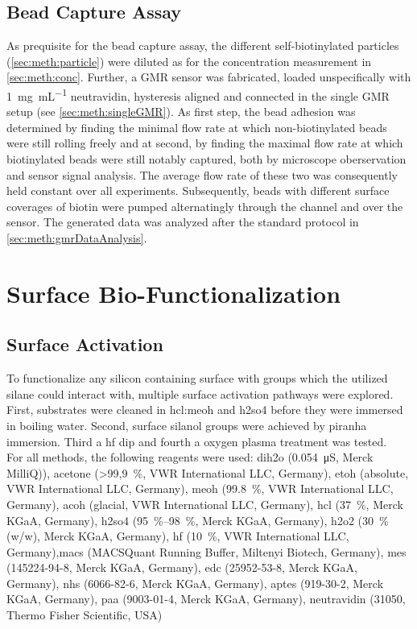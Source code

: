 \subsection{Bead Capture Assay}
As prequisite for the bead capture assay, the different self-biotinylated particles (\cref{sec:meth:particle}) were diluted as for the concentration measurement in \cref{sec:meth:conc}.  Further, a GMR sensor was fabricated, loaded unspecifically with \SI{1}{\milli\gram\per\milli\liter} neutravidin, hysteresis aligned and connected in the single GMR setup (see \ref{sec:meth:singleGMR}). As first step, the bead adhesion was determined by finding the minimal flow rate at which non-biotinylated beads were still rolling freely and at second, by finding the maximal flow rate at which biotinylated beads were still notably captured, both by microscope oberservation and sensor signal analysis. The average flow rate of these two was consequently held constant over all experiments. Subsequently, beads with different surface coverages of biotin were pumped alternatingly through the channel and over the sensor. The generated data was analyzed after the standard protocol in \ref{sec:meth:gmrDataAnalysis}.
\section{Surface Bio-Functionalization}
\subsection{Surface Activation}
\label{sec:meth:surfActiv}
To functionalize any silicon containing surface with  groups which the utilized silane could interact with, multiple surface activation pathways were explored. First, substrates were cleaned in \gls{hcl}:\gls{meoh} and \gls{h2so4} before they were immersed in boiling water. Second, surface silanol groups were achieved by piranha immersion. Third a \gls{hf} dip and fourth a oxygen plasma treatment was tested.\\
For all methods, the following reagents were used: \gls{dih2o} (\SI{0,054}{\micro\siemens}, Merck MilliQ)), acetone (\SI{>99,9}{\percent}, VWR International LLC, Germany), \gls{etoh} (absolute, VWR International LLC, Germany), \gls{meoh} (\SI{99.8}{\percent}, VWR International LLC, Germany), \gls{acoh} (glacial,  VWR International LLC, Germany), \gls{hcl} (\SI{37}{\percent}, Merck KGaA, Germany), \gls{h2so4} (\SIrange{95}{98}{\percent}, Merck KGaA, Germany), \gls{h2o2} (\SI{30}{\percent} (w/w), Merck KGaA, Germany), \gls{hf} (\SI{10}{\percent},  VWR International LLC, Germany),\gls{macs} (MACSQuant Running Buffer, Miltenyi Biotech, Germany), \gls{mes} (145224-94-8, Merck KGaA, Germany), \gls{edc} (25952-53-8, Merck KGaA, Germany), \gls{nhs} (6066-82-6, Merck KGaA, Germany), \gls{aptes} (919-30-2, Merck KGaA, Germany), \gls{paa} (9003-01-4, Merck KGaA, Germany), neutravidin (31050, Thermo Fisher Scientific, USA)
